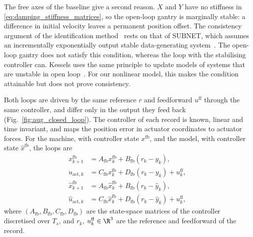 The free axes of the baseline give a second reason.
$X$ and $Y$ have no stiffness in \eqref{eq:damping_stiffness_matrices}, so the
open-loop gantry is marginally stable: a difference in initial velocity leaves
a permanent position offset.
The consistency argument of the identification
method~\cite[Sec.~5.5]{hoekstra2026lfr} rests on that of SUBNET, which assumes
an incrementally exponentially output stable data-generating
system~\cite[Cond.~1]{beintema2023subnet}.
The open-loop gantry does not satisfy this condition, whereas the loop with
the stabilising controller can.
Kessels uses the same principle to update models of systems that are unstable
in open loop~\cite[Ch.~5]{kessels2025ai}.
For our nonlinear model, this makes the condition attainable but does not
prove consistency.

Both loops are driven by the same reference $r$ and feedforward
$u^{\mathrm{ff}}$ through the same controller, and differ only in the output
they feed back (Fig.~\ref{fig:aug_closed_loop}).
The controller of each record is known, linear and time invariant, and maps
the position error in actuator coordinates to actuator forces.
For the machine, with controller state $x^{\mathrm{fb}}$, and the model, with
controller state $\hat x^{\mathrm{fb}}$, the loops are
\begin{equation}
\begin{aligned}
 x^{\mathrm{fb}}_{k+1}&=A_{\mathrm{fb}}x^{\mathrm{fb}}_k+B_{\mathrm{fb}}(r_k-y_k),\\
 u_{\mathrm{act},k}&=C_{\mathrm{fb}}x^{\mathrm{fb}}_k+D_{\mathrm{fb}}(r_k-y_k)+u^{\mathrm{ff}}_k,\\
 \hat x^{\mathrm{fb}}_{k+1}&=A_{\mathrm{fb}}\hat x^{\mathrm{fb}}_k+B_{\mathrm{fb}}(r_k-\hat y_k),\\
 \hat u_{\mathrm{act},k}&=C_{\mathrm{fb}}\hat x^{\mathrm{fb}}_k+D_{\mathrm{fb}}(r_k-\hat y_k)+u^{\mathrm{ff}}_k,
\end{aligned}
\label{eq:aug_direct_loop}
\end{equation}
where $(A_{\mathrm{fb}},B_{\mathrm{fb}},C_{\mathrm{fb}},D_{\mathrm{fb}})$ are
the state-space matrices of the controller discretised over $T_s$, and $r_k$,
$u^{\mathrm{ff}}_k\in\R^3$ are the reference and feedforward of the record.


